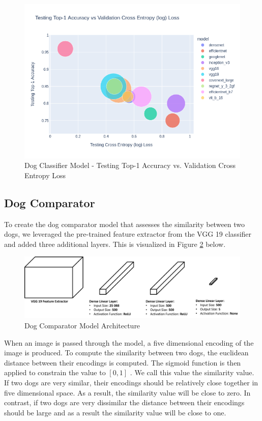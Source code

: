 \documentclass{article}
\begin{document}
\begin{figure}[h]
\centering
	\includegraphics[scale=0.60]{final-report-images/test_accuracy_comp_fig.png}
\caption{Dog Classifier Model - Testing Top-1 Accuracy vs. Validation Cross Entropy Loss}
\label{fig:model2 testing accuracy}
\end{figure}

\clearpage

\subsection{Dog Comparator}
To create the dog comparator model that assesses the similarity between two dogs, we leveraged the pre-trained feature extractor from the VGG 19 classifier \cite{SimonyanKaren2014VDCN} and added three additional layers.  This is visualized in Figure \ref{fig:x comparator} below.

\begin{figure}[h]
\centering
	\includegraphics[scale=0.4]{final-report-images/dog_comparator.png}
\caption{Dog Comparator Model Architecture}
\label{fig:x comparator}
\end{figure}

\noindent When an image is passed through the model, a five dimensional encoding of the image is produced.  To compute the similarity between two dogs, the euclidean distance between their encodings is computed.  The sigmoid function is then applied to constrain the value to $[0,1]$ .  We call this value the similarity value.  If two dogs are very similar, their encodings should be relatively close together in five dimensional space.  As a result, the similarity value will be close to zero.  In contrast, if two dogs are very dissimilar the distance between their encodings should be large and as a result the similarity value will be close to one.  
\end{document}
